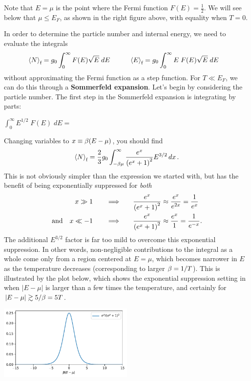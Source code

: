 Note that $E = \mu$ is the point where the Fermi function $F(E) = \frac{1}{2}$.
We will see below that $\mu \leq E_F$, as shown in the right figure above, with equality when $T = 0$.

In order to determine the particle number and internal energy, we need to evaluate the integrals
\begin{align}
  \label{eq:DoS_full}
  \left\langle N \right\rangle_{\text{f}} & = g_0 \int_0^{\infty} F(E) \sqrt{E} \; dE \qquad &
  \left\langle E \right\rangle_{\text{f}} & = g_0 \int_0^{\infty} E \; F(E) \sqrt{E} \; dE
\end{align}
without approximating the Fermi function as a step function.
For $T \ll E_F$, we can do this through a \textbf{Sommerfeld expansion}.
Let's begin by considering the particle number.
The first step in the Sommerfeld expansion is integrating by parts:
\begin{mdframed}
  $\displaystyle \int_0^{\infty} E^{1 / 2} \; F(E) \; dE = $ \\[120 pt]
\end{mdframed}

Changing variables to $x \equiv \beta(E - \mu)$, you should find
\begin{equation*}
  \left\langle N \right\rangle_{\text{f}} = \frac{2}{3} g_0 \int_{-\beta\mu}^{\infty} \frac{e^x}{\left(e^x + 1\right)^2} E^{3 / 2} \mathop{dx}.
\end{equation*}
This is not obviously simpler than the expression we started with, but has the benefit of being exponentially suppressed for \textit{both}
\begin{align*}
                   x \gg 1  \qquad \Longrightarrow \qquad & \frac{e^x}{\left(e^x + 1\right)^2} \approx \frac{e^x}{e^{2x}} = \frac{1}{e^x} \\
  \mbox{and} \quad x \ll -1 \qquad \Longrightarrow \qquad & \frac{e^x}{\left(e^x + 1\right)^2} \approx \frac{e^x}{1} = \frac{1}{e^{-x}}.
\end{align*}
The additional $E^{3 / 2}$ factor is far too mild to overcome this exponential suppression.
In other words, non-negligible contributions to the integral as a whole come only from a region centered at $E = \mu$, which becomes narrower in $E$ as the temperature decreases (corresponding to larger $\beta = 1 / T$).
This is illustrated by the plot below, which shows the exponential suppression setting in when $|E - \mu|$ is larger than a few times the temperature, and certainly for $|E - \mu| \gtrsim 5 / \beta = 5T$. \\[-24 pt]
\begin{center}\noindent\includegraphics[width=0.5\textwidth]{figs/unit08_Sommerfeld.pdf}\end{center} %

